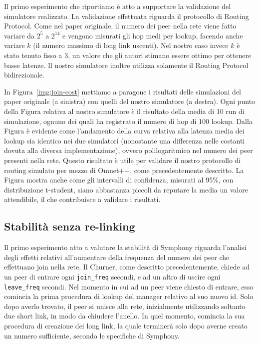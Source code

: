 \documentclass[prodmode,acmtap]{acmlarge}
\begin{document}
Il primo esperimento che riportiamo è atto a supportare la validazione del simulatore realizzato. La validazione effettuata riguarda il protocollo di Routing Protocol. Come nel paper originale, il numero dei peer nella rete viene fatto variare da $2^5$ a $2^{14}$ e vengono misurati gli hop medi per lookup, facendo anche variare $k$ (il numero massimo di long link uscenti). Nel nostro caso invece $k$ è stato tenuto fisso a $3$, un valore che gli autori stimano essere ottimo per ottenere basse latenze. Il nostro simulatore inoltre utilizza solamente il Routing Protocol bidirezionale.

In Figura~\ref{img:join-cost} mettiamo a paragone i risultati delle simulazioni del paper originale (a sinistra) con quelli del nostro simulatore (a destra). Ogni punto della Figura relativa al nostro simulatore è il risultato della media di 10 run di simulazione, ognuno dei quali ha registrato il numero di hop di 100 lookup. Dalla Figura è evidente come l'andamento della curva relativa alla latenza media dei lookup sia identico nei due simulatori (nonostante una differenza nelle costanti dovuta alla diversa implementazione), ovvero polilogaritmico nel numero dei peer presenti nella rete. Questo risultato è utile per validare il nostro protocollo di routing simulato per mezzo di Omnet++, come precedentemente descritto. La Figura mostra anche come gli intervalli di confidenza, misurati al 95\%, con distribuzione t-student, siano abbastanza piccoli da reputare la media un valore attendibile, il che contribuisce a validare i risultati.

\subsection{Stabilità senza re-linking}
Il primo esperimento atto a valutare la stabilità di Symphony riguarda l'analisi degli effetti relativi all'aumentare della frequenza del numero dei peer che effettuano join nella rete.
Il Churner, come descritto precedentemente, chiede ad un peer di entrare ogni \texttt{join\_freq} secondi, e ad un altro di uscire ogni \texttt{leave\_freq} secondi. Nel momento in cui ad un peer viene chiesto di entrare, esso comincia la prima procedura di lookup del manager relativo al suo nuovo id. Solo dopo averlo trovato, il peer si unisce alla rete, inizialmente utilizzando soltanto due short link, in modo da chiudere l'anello. In quel momento, comincia la sua procedura di creazione dei long link, la quale terminerà solo dopo averne creato un numero sufficiente, secondo le specifiche di Symphony.
\end{document}
